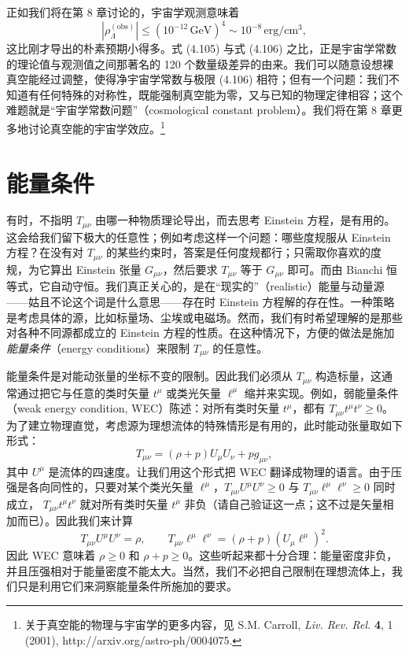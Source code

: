 正如我们将在第 8 章讨论的，宇宙学观测意味着
\begin{equation*}
\left|\rho^{(\mathrm{obs})}_{\Lambda}\right| \leq (10^{-12}\,\mathrm{GeV})^4 \sim 10^{-8}\,\mathrm{erg/cm^3},
\tag{4.106}
\end{equation*}
这比刚才导出的朴素预期小得多。式 (4.105) 与式 (4.106) 之比，正是宇宙学常数的理论值与观测值之间那著名的 120 个数量级差异的由来。我们可以随意设想裸真空能经过调整，使得净宇宙学常数与极限 (4.106) 相符；但有一个问题：我们不知道有任何特殊的对称性，既能强制真空能为零，又与已知的物理定律相容；这个难题就是“宇宙学常数问题”（cosmological constant problem）。我们将在第 8 章更多地讨论真空能的宇宙学效应。\footnote{关于真空能的物理与宇宙学的更多内容，见 S.M. Carroll, \emph{Liv. Rev. Rel.} \textbf{4}, 1 (2001), http://arxiv.org/astro-ph/0004075.}

\section{能量条件}

有时，不指明 $T_{\mu\nu}$ 由哪一种物质理论导出，而去思考 Einstein 方程，是有用的。这会给我们留下极大的任意性；例如考虑这样一个问题：哪些度规服从 Einstein 方程？在没有对 $T_{\mu\nu}$ 的某些约束时，答案是任何度规都行；只需取你喜欢的度规，为它算出 Einstein 张量 $G_{\mu\nu}$，然后要求 $T_{\mu\nu}$ 等于 $G_{\mu\nu}$ 即可。而由 Bianchi 恒等式，它自动守恒。我们真正关心的，是在“现实的”（realistic）能量与动量源——姑且不论这个词是什么意思——存在时 Einstein 方程解的存在性。一种策略是考虑具体的源，比如标量场、尘埃或电磁场。然而，我们有时希望理解的是那些对各种不同源都成立的 Einstein 方程的性质。在这种情况下，方便的做法是施加\emph{能量条件}（energy conditions）来限制 $T_{\mu\nu}$ 的任意性。

能量条件是对能动张量的坐标不变的限制。因此我们必须从 $T_{\mu\nu}$ 构造标量，这通常通过把它与任意的类时矢量 $t^\mu$ 或类光矢量 $\ell^\mu$ 缩并来实现。例如，弱能量条件（weak energy condition, WEC）陈述：对所有类时矢量 $t^\mu$，都有 $T_{\mu\nu}t^\mu t^\nu\geq 0$。为了建立物理直觉，考虑源为理想流体的特殊情形是有用的，此时能动张量取如下形式：
\begin{equation*}
T_{\mu\nu} = (\rho + p)U_\mu U_\nu + pg_{\mu\nu},
\tag{4.107}
\end{equation*}
其中 $U^\mu$ 是流体的四速度。让我们用这个形式把 WEC 翻译成物理的语言。由于压强是各向同性的，只要对某个类光矢量 $\ell^\mu$，$T_{\mu\nu}U^\mu U^\nu \geq 0$ 与 $T_{\mu\nu}\ell^\mu\ell^\nu \geq 0$ 同时成立，
$T_{\mu\nu}t^\mu t^\nu$ 就对所有类时矢量 $t^\mu$ 非负（请自己验证这一点；这不过是矢量相加而已）。因此我们来计算
\begin{equation*}
T_{\mu\nu}U^\mu U^\nu = \rho, \qquad T_{\mu\nu}\ell^\mu\ell^\nu = (\rho + p)(U_\mu \ell^\mu)^2.
\tag{4.108}
\end{equation*}
因此 WEC 意味着 $\rho \geq 0$ 和 $\rho + p \geq 0$。这些听起来都十分合理：能量密度非负，并且压强相对于能量密度不能太大。当然，我们不必把自己限制在理想流体上，我们只是利用它们来洞察能量条件所施加的要求。

